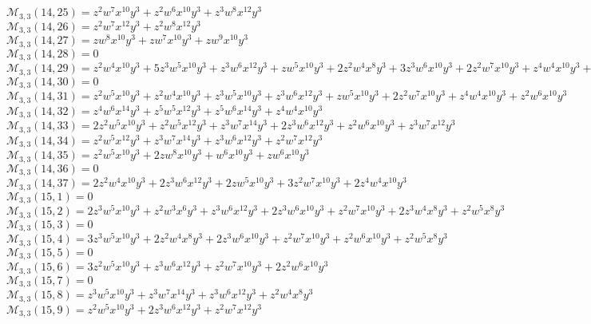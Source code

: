 \documentclass[12pt]{memoireuqam1.3}
\begin{document}
$\mathcal{M}_{3,3}(14,25)=z^2w^7x^{10}y^3+z^2w^6x^{10}y^3+z^3w^8x^{12}y^3$\\
$\mathcal{M}_{3,3}(14,26)=z^2w^7x^{12}y^3+z^2w^8x^{12}y^3$\\
$\mathcal{M}_{3,3}(14,27)=zw^8x^{10}y^3+zw^7x^{10}y^3+zw^9x^{10}y^3$\\
$\mathcal{M}_{3,3}(14,28)=0$\\
$\mathcal{M}_{3,3}(14,29)=z^2w^4x^{10}y^3+5z^3w^5x^{10}y^3+z^3w^6x^{12}y^3+zw^5x^{10}y^3+2z^2w^4x^8y^3+3z^3w^6x^{10}y^3+2z^2w^7x^{10}y^3+z^4w^4x^{10}y^3+z^2w^5x^8y^3$\\
$\mathcal{M}_{3,3}(14,30)=0$\\
$\mathcal{M}_{3,3}(14,31)=z^2w^5x^{10}y^3+z^2w^4x^{10}y^3+z^3w^5x^{10}y^3+z^3w^6x^{12}y^3+zw^5x^{10}y^3+2z^2w^7x^{10}y^3+z^4w^4x^{10}y^3+z^2w^6x^{10}y^3$\\
$\mathcal{M}_{3,3}(14,32)=z^4w^6x^{14}y^3+z^5w^5x^{12}y^3+z^5w^6x^{14}y^3+z^4w^4x^{10}y^3$\\
$\mathcal{M}_{3,3}(14,33)=2z^2w^5x^{10}y^3+z^2w^5x^{12}y^3+z^3w^7x^{14}y^3+2z^3w^6x^{12}y^3+z^2w^6x^{10}y^3+z^3w^7x^{12}y^3$\\
$\mathcal{M}_{3,3}(14,34)=z^2w^5x^{12}y^3+z^3w^7x^{14}y^3+z^3w^6x^{12}y^3+z^2w^7x^{12}y^3$\\
$\mathcal{M}_{3,3}(14,35)=z^2w^5x^{10}y^3+2zw^8x^{10}y^3+w^6x^{10}y^3+zw^6x^{10}y^3$\\
$\mathcal{M}_{3,3}(14,36)=0$\\
$\mathcal{M}_{3,3}(14,37)=2z^2w^4x^{10}y^3+2z^3w^6x^{12}y^3+2zw^5x^{10}y^3+3z^2w^7x^{10}y^3+2z^4w^4x^{10}y^3$\\
$\mathcal{M}_{3,3}(15,1)=0$\\
$\mathcal{M}_{3,3}(15,2)=2z^3w^5x^{10}y^3+z^2w^3x^6y^3+z^3w^6x^{12}y^3+2z^3w^6x^{10}y^3+z^2w^7x^{10}y^3+2z^3w^4x^8y^3+z^2w^5x^8y^3$\\
$\mathcal{M}_{3,3}(15,3)=0$\\
$\mathcal{M}_{3,3}(15,4)=3z^3w^5x^{10}y^3+2z^2w^4x^8y^3+2z^3w^6x^{10}y^3+z^2w^7x^{10}y^3+z^2w^6x^{10}y^3+z^2w^5x^8y^3$\\
$\mathcal{M}_{3,3}(15,5)=0$\\
$\mathcal{M}_{3,3}(15,6)=3z^2w^5x^{10}y^3+z^3w^6x^{12}y^3+z^2w^7x^{10}y^3+2z^2w^6x^{10}y^3$\\
$\mathcal{M}_{3,3}(15,7)=0$\\
$\mathcal{M}_{3,3}(15,8)=z^3w^5x^{10}y^3+z^3w^7x^{14}y^3+z^3w^6x^{12}y^3+z^2w^4x^8y^3$\\
$\mathcal{M}_{3,3}(15,9)=z^2w^5x^{10}y^3+2z^3w^6x^{12}y^3+z^2w^7x^{12}y^3$\\
\end{document}
